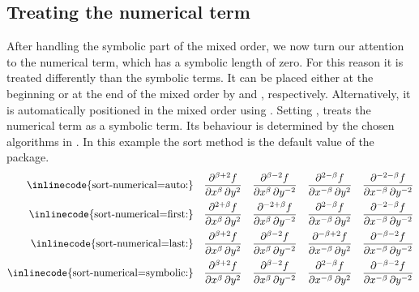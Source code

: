 \subsection{Treating the numerical term} \label{ssec:sort-numerical}
After handling the symbolic part of the mixed order, we now turn our attention to the numerical term, which has a symbolic length of zero. For this reason it is treated differently than the symbolic terms. It can be placed either at the beginning or at the end of the mixed order by  and , respectively. Alternatively, it is automatically positioned in the mixed order using . Setting , treats the numerical term as a symbolic term. Its behaviour is determined by the chosen algorithms in . In this example the sort method is the default value of the package.
\begin{align*}
	\text{\inlinecode{sort-numerical=auto:}}  && 
	\pdv[order={\beta, 2}, sort-numerical=auto]{f}{x,y}   &&
	\pdv[order={\beta, -2}, sort-numerical=auto]{f}{x,y}  &&
	\pdv[order={-\beta, 2}, sort-numerical=auto]{f}{x,y}  &&
	\pdv[order={-\beta, -2}, sort-numerical=auto]{f}{x,y} \\
	\text{\inlinecode{sort-numerical=first:}} &&
	\pdv[order={\beta, 2}, sort-numerical=first]{f}{x,y}   &&   \pdv[order={\beta, -2}, sort-numerical=first]{f}{x,y}  &&   \pdv[order={-\beta, 2}, sort-numerical=first]{f}{x,y}  &&   \pdv[order={-\beta, -2}, sort-numerical=first]{f}{x,y} \\
	\text{\inlinecode{sort-numerical=last:}}  &&
	\pdv[order={\beta, 2}, sort-numerical=last]{f}{x,y}   &&   \pdv[order={\beta, -2}, sort-numerical=last]{f}{x,y}  &&   \pdv[order={-\beta, 2}, sort-numerical=last]{f}{x,y}  &&   \pdv[order={-\beta, -2}, sort-numerical=last]{f}{x,y} \\
	\text{\inlinecode{sort-numerical=symbolic:}}  && 
	\pdv[order={\beta, 2}, sort-numerical=symbolic]{f}{x,y}   &&   \pdv[order={\beta, -2}, sort-numerical=symbolic]{f}{x,y}  &&   \pdv[order={-\beta, 2}, sort-numerical=symbolic]{f}{x,y}  &&   \pdv[order={-\beta, -2}, sort-numerical=symbolic]{f}{x,y}
\end{align*}

